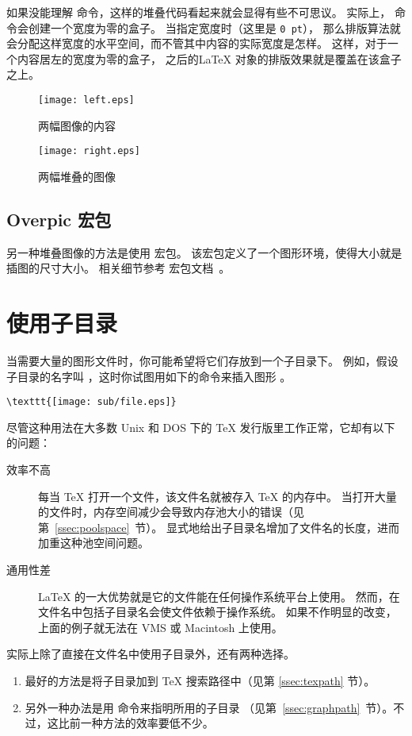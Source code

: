 如果没能理解  命令，这样的堆叠代码看起来就会显得有些不可思议。
实际上， 命令会创建一个宽度为零的盒子。
当指定宽度时（这里是 \texttt{0 pt}），
那么排版算法就会分配这样宽度的水平空间，而不管其中内容的实际宽度是怎样。
这样，对于一个内容居左的宽度为零的盒子，
之后的\LaTeX{} 对象的排版效果就是覆盖在该盒子之上。

\begin{figure}
	\centering
	\texttt{[image: left.eps]}
	\caption{两幅图像的内容}\label{fig:leftright}
\end{figure}
\begin{figure}
	\centering
	\texttt{[image: right.eps]}
	\caption{两幅堆叠的图像}\label{fig:leftrightoverlay}
\end{figure}

\subsection{Overpic 宏包}
另一种堆叠图像的方法是使用  宏包。
该宏包定义了一个图形环境，使得大小就是插图的尺寸大小。
相关细节参考  宏包文档~\cite{overpic-doc}。


\section{使用子目录}\label{sec:subdir}

当需要大量的图形文件时，你可能希望将它们存放到一个子目录下。
例如，假设子目录的名字叫 ，这时你试图用如下的命令来插入图形 。
\begin{lstlisting}
\texttt{[image: sub/file.eps]}
\end{lstlisting}

尽管这种用法在大多数 Unix 和 DOS 下的 \TeX{} 发行版里工作正常，它却有以下的问题：
\begin{description}
	\item [效率不高]
	
	每当 \TeX{} 打开一个文件，该文件名就被存入 TeX{} 的内存中。
	当打开大量的文件时，内存空间减少会导致内存池大小的错误（见第~\ref{ssec:poolspace}~节）。
	显式地给出子目录名增加了文件名的长度，进而加重这种池空间问题。
	
	\item [通用性差]
	
	\LaTeX{} 的一大优势就是它的文件能在任何操作系统平台上使用。
	然而，在文件名中包括子目录名会使文件依赖于操作系统。
	如果不作明显的改变，上面的例子就无法在 VMS 或 Macintosh 上使用。
\end{description}
实际上除了直接在文件名中使用子目录外，还有两种选择。
\begin{enumerate}
	\item 最好的方法是将子目录加到 \TeX{} 搜索路径中（见第 \ref{ssec:texpath} 节）。
	\item 另外一种办法是用  命令来指明所用的子目录
	（见第~\ref{ssec:graphpath}~节）。不过，这比前一种方法的效率要低不少。
\end{enumerate}


